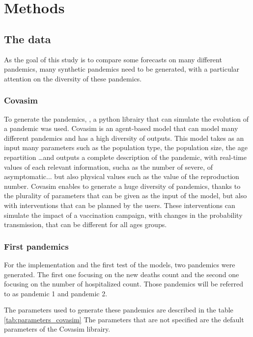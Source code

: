 \section{Methods}

\subsection*{The data}

As the goal of this study is to compare some forecasts on many different pandemics, many synthetic pandemics need to be generated, with a particular attention on the diversity of these pandemics. 

\subsubsection{Covasim}

To generate the pandemics,  \cite{kerr2021covasim}, a python librairy that can simulate the evolution of a pandemic was used. 
Covasim is an agent-based model that can model many different pandemics and has a high diversity of outputs. 
This model takes as an input many parameters such as the population type, the population size, the age repartition \dots and outputs a complete description of the pandemic, with real-time values of each relevant information, sucha as the number of severe, of asymptomatic... but also physical values such as the value of the reproduction number. 
Covasim enables to generate a huge diversity of pandemics, thanks to the plurality of parameters that can be given as the input of the model, but also with interventions that can be planned by the users. 
These interventions can simulate the impact of a vaccination campaign, with changes in the probability transmission, that can be different for all ages groups. 

\subsubsection{First pandemics}

For the implementation and the first test of the models, two pandemics were generated. 
The first one focusing on the new deaths count and the second one focusing on the number of hospitalized count. 
Those pandemics will be referred to as pandemic 1 and pandemic 2. 




The parameters used to generate these pandemics are described in the table \ref{tab:parameters_covasim} 
The parameters that are not specified are the default parameters of the Covasim librairy. 


